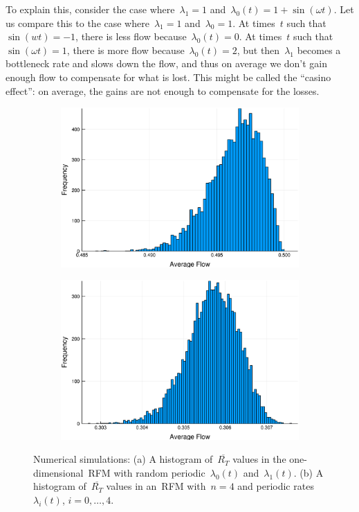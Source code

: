 To explain this, consider the case where~$\lambda_1=1$ and~$\lambda_0(t)=1+\sin(\omega t)$.  
Let us compare this to the case where~$\lambda_1=1$ and~$\lambda_0= 1$. 
At times~$t$ such that~$\sin (wt)=-1$, there is less flow because~$\lambda_0(t)=0$.
At times~$t$ such that~$\sin(\omega t)=1$, there is more flow  because~$\lambda_0(t)=2$, but then~$\lambda_1$ becomes a bottleneck rate and slows down the flow, and thus on average we don't gain enough flow to compensate for what is lost.
This might be called the ``casino effect'': on average, the gains are not enough to compensate for the losses.

\begin{figure}[t!]
	\centering
	\begin{subfigure}[t]{0.49\textwidth}
		\centering
		\includegraphics[width=.99\linewidth]{fig/rfm-hist1.eps}
		\caption{}
		\label{fig:1}
	\end{subfigure}
	\begin{subfigure}[t]{0.49\textwidth}
		\centering
		\includegraphics[width=.99\linewidth]{fig/rfm-hist2.eps}
		\caption{}
		\label{fig:2}
	\end{subfigure}
	\caption[Numerical simulations]{Numerical simulations: (a) A histogram of~$\overline{R_T}$ values 
		in the one-dimensional~\ac{RFM} with random
		periodic~$\lambda_0(t)$ and~$\lambda_1(t)$. 
		(b) A histogram of~$\overline{R_T}$ values 
		in an~\ac{RFM} with~$n=4$
		and periodic rates~$\lambda_i(t)$, $i=0,\dots,4$.}
\end{figure}

